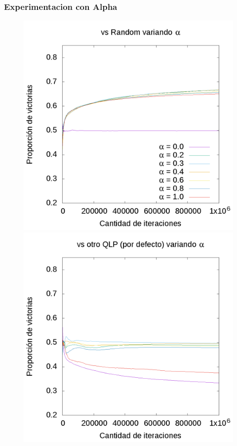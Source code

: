 \documentclass[10pt, a4paper]{article}
\begin{document}
\subsubsection{Experimentacion con Alpha}
\begin{figure}[H]
  \begin{minipage}[c]{1\textwidth}
	\includegraphics[scale=0.25]{AlphaR.png}
	\includegraphics[scale=0.25]{AlphaQ.png}

\end{minipage}
\end{figure}
\end{document}
